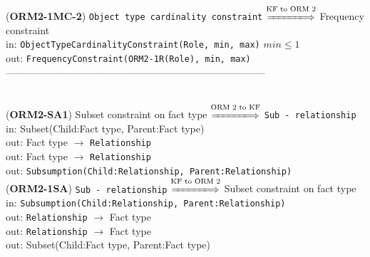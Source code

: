 \documentclass[sn-mathphys]{sn-jnl}
\begin{document}
{{{{({\bf ORM2-1MC-2}) {\tt Object type cardinality constraint} $\overset{\text{KF to ORM 2}}{\xLongrightarrow{\hspace*{1.4cm}}}$ {Frequency constraint}\\
\hspace*{0.3cm}in: {\tt   ObjectTypeCardinalityConstraint(Role, min, max)} \hfill $min\leq 1$ \\ %
\hspace*{0.5cm}out:  {\tt FrequencyConstraint(ORM2-1R(Role), min, max)}\\

------------------------------------------------------------------------------
\\ \

({\bf ORM2-SA1}) {Subset constraint on fact type} $\overset{\text{ORM 2 to KF}}{\xLongrightarrow{\hspace*{1.4cm}}}$ {\tt Sub - relationship}\\
\hspace*{0.3cm}in: {Subset(Child:Fact type, Parent:Fact type)} \\
\hspace*{0.5cm}out:  {Fact type} $\rightarrow$ {\tt Relationship }\\
\hspace*{0.5cm}out:  {Fact type} $\rightarrow$ {\tt Relationship }\\
\hspace*{0.5cm}out:  {\tt Subsumption(Child:Relationship, Parent:Relationship)}\\

({\bf ORM2-1SA}) {\tt Sub - relationship} $\overset{\text{KF to ORM 2}}{\xLongrightarrow{\hspace*{1.4cm}}}$ {Subset constraint on fact type}\\
\hspace*{0.3cm}in: {\tt Subsumption(Child:Relationship, Parent:Relationship)} \\
\hspace*{0.5cm}out:  {\tt Relationship} $\rightarrow$ {Fact type}\\
\hspace*{0.5cm}out:  {\tt Relationship} $\rightarrow$ {Fact type}\\
\hspace*{0.5cm}out:  {Subset(Child:Fact type, Parent:Fact type)}\\

}}}}
\end{document}
